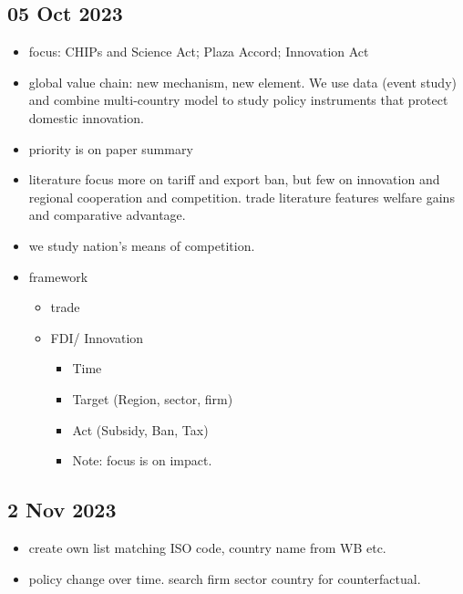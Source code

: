 	\subsection{05 Oct 2023}
		\begin{itemize}
		\item focus: CHIPs and Science Act; Plaza Accord; Innovation Act
		\item global value chain: new mechanism, new element. We use data (event study) and combine multi-country model to study policy instruments that protect domestic innovation.
		\item priority is on paper summary
		\item literature focus more on tariff and export ban, but few on innovation and regional cooperation and competition. trade literature features welfare gains and comparative advantage.
		\item we study nation's means of competition.
		\item framework
			\begin{itemize}
			\item trade
			\item FDI/ Innovation
				\begin{itemize}
				\item Time
				\item Target (Region, sector, firm)
				\item Act (Subsidy, Ban, Tax)
				\item Note: focus is on impact.
				\end{itemize}
			\end{itemize}
		\end{itemize}
	\subsection{2 Nov 2023}
		\begin{itemize}
		\item create own list matching ISO code, country name from WB etc.
		\item policy change over time. search firm sector country for counterfactual.
		\end{itemize}

\newpage

\footnotesize




